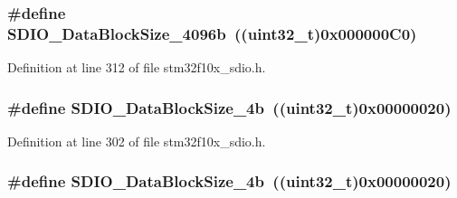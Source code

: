 \subsubsection[{\texorpdfstring{S\+D\+I\+O\+\_\+\+Data\+Block\+Size\+\_\+4096b}{SDIO_DataBlockSize_4096b}}]{\setlength{\rightskip}{0pt plus 5cm}\#define S\+D\+I\+O\+\_\+\+Data\+Block\+Size\+\_\+4096b~(({\bf uint32\+\_\+t})0x000000\+C0)}\hypertarget{group___s_d_i_o___data___block___size_ga360411488abdbaf9eee9b99fca793f79}{}\label{group___s_d_i_o___data___block___size_ga360411488abdbaf9eee9b99fca793f79}


Definition at line 312 of file stm32f10x\+\_\+sdio.\+h.

\subsubsection[{\texorpdfstring{S\+D\+I\+O\+\_\+\+Data\+Block\+Size\+\_\+4b}{SDIO_DataBlockSize_4b}}]{\setlength{\rightskip}{0pt plus 5cm}\#define S\+D\+I\+O\+\_\+\+Data\+Block\+Size\+\_\+4b~(({\bf uint32\+\_\+t})0x00000020)}\hypertarget{group___s_d_i_o___data___block___size_ga59cbaecfdebd63177d1208c268626f0a}{}\label{group___s_d_i_o___data___block___size_ga59cbaecfdebd63177d1208c268626f0a}


Definition at line 302 of file stm32f10x\+\_\+sdio.\+h.

\subsubsection[{\texorpdfstring{S\+D\+I\+O\+\_\+\+Data\+Block\+Size\+\_\+4b}{SDIO_DataBlockSize_4b}}]{\setlength{\rightskip}{0pt plus 5cm}\#define S\+D\+I\+O\+\_\+\+Data\+Block\+Size\+\_\+4b~(({\bf uint32\+\_\+t})0x00000020)}\hypertarget{group___s_d_i_o___data___block___size_ga59cbaecfdebd63177d1208c268626f0a}{}\label{group___s_d_i_o___data___block___size_ga59cbaecfdebd63177d1208c268626f0a}



